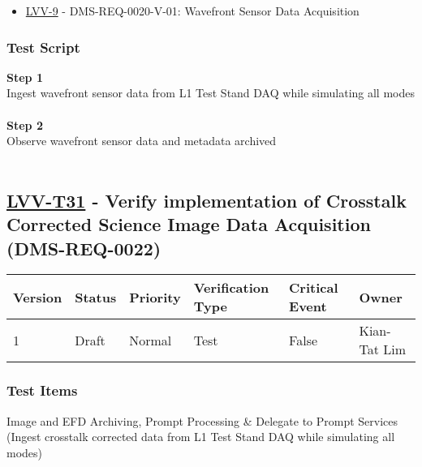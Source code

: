 \begin{itemize}
\tightlist
\item
  \href{https://jira.lsstcorp.org/browse/LVV-9}{LVV-9} -
  DMS-REQ-0020-V-01: Wavefront Sensor Data Acquisition
\end{itemize}

\hypertarget{test-script-7}{%
\subsubsection{Test Script}\label{test-script-7}}

\textbf{Step 1}\\
{Ingest wavefront sensor data from L1 Test Stand DAQ while simulating
all modes}\\
~\\
\textbf{Step 2}\\
Observe wavefront sensor data and metadata archived\\
~\\

\hypertarget{lvv-t31---verify-implementation-of-crosstalk-corrected-science-image-data-acquisition-dms-req-0022}{%
\subsection{\texorpdfstring{\href{https://jira.lsstcorp.org/secure/Tests.jspa\#/testCase/LVV-T31}{LVV-T31}
- Verify implementation of Crosstalk Corrected Science Image Data
Acquisition
(DMS-REQ-0022)}{LVV-T31 - Verify implementation of Crosstalk Corrected Science Image Data Acquisition (DMS-REQ-0022)}}\label{lvv-t31---verify-implementation-of-crosstalk-corrected-science-image-data-acquisition-dms-req-0022}}

\begin{longtable}[]{@{}llllll@{}}
\toprule
Version & Status & Priority & Verification Type & Critical Event &
Owner\tabularnewline
\midrule
\endhead
1 & Draft & Normal & Test & False & Kian-Tat Lim\tabularnewline
\bottomrule
\end{longtable}

\hypertarget{test-items-7}{%
\subsubsection{Test Items}\label{test-items-7}}

Image and EFD Archiving, Prompt Processing \& Delegate to Prompt
Services (Ingest crosstalk corrected data from L1 Test Stand DAQ while
simulating all modes)


